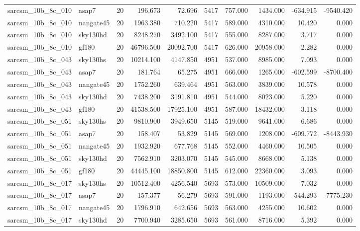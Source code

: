\begin{tabular}{llrrrrrrrr}
sarcsm\_10b\_8c\_010 & asap7 & 20 & 196.673 & 72.696 & 5417 & 757.000 & 1434.000 & -634.915 & -9540.420 \\
sarcsm\_10b\_8c\_010 & nangate45 & 20 & 1963.380 & 710.220 & 5417 & 589.000 & 4310.000 & 10.420 & 0.000 \\
sarcsm\_10b\_8c\_010 & sky130hd & 20 & 8248.270 & 3492.100 & 5417 & 555.000 & 8287.000 & 3.717 & 0.000 \\
sarcsm\_10b\_8c\_010 & gf180 & 20 & 46796.500 & 20092.700 & 5417 & 626.000 & 20958.000 & 2.282 & 0.000 \\
sarcsm\_10b\_8c\_043 & sky130hs & 20 & 10214.100 & 4147.850 & 4951 & 537.000 & 8985.000 & 7.093 & 0.000 \\
sarcsm\_10b\_8c\_043 & asap7 & 20 & 181.764 & 65.275 & 4951 & 666.000 & 1265.000 & -602.599 & -8700.400 \\
sarcsm\_10b\_8c\_043 & nangate45 & 20 & 1752.260 & 639.464 & 4951 & 563.000 & 3839.000 & 10.578 & 0.000 \\
sarcsm\_10b\_8c\_043 & sky130hd & 20 & 7438.200 & 3191.810 & 4951 & 544.000 & 8023.000 & 5.220 & 0.000 \\
sarcsm\_10b\_8c\_043 & gf180 & 20 & 41538.500 & 17925.100 & 4951 & 587.000 & 18432.000 & 3.118 & 0.000 \\
sarcsm\_10b\_8c\_051 & sky130hs & 20 & 9810.900 & 3949.650 & 5145 & 519.000 & 9641.000 & 6.686 & 0.000 \\
sarcsm\_10b\_8c\_051 & asap7 & 20 & 158.407 & 53.829 & 5145 & 569.000 & 1208.000 & -609.772 & -8443.930 \\
sarcsm\_10b\_8c\_051 & nangate45 & 20 & 1932.920 & 677.768 & 5145 & 552.000 & 4460.000 & 10.505 & 0.000 \\
sarcsm\_10b\_8c\_051 & sky130hd & 20 & 7562.910 & 3203.070 & 5145 & 545.000 & 8668.000 & 5.138 & 0.000 \\
sarcsm\_10b\_8c\_051 & gf180 & 20 & 44445.100 & 18850.800 & 5145 & 612.000 & 22360.000 & 3.093 & 0.000 \\
sarcsm\_10b\_8c\_017 & sky130hs & 20 & 10512.400 & 4256.540 & 5693 & 573.000 & 10509.000 & 7.032 & 0.000 \\
sarcsm\_10b\_8c\_017 & asap7 & 20 & 157.377 & 56.279 & 5693 & 591.000 & 1193.000 & -544.293 & -7775.230 \\
sarcsm\_10b\_8c\_017 & nangate45 & 20 & 1796.910 & 642.656 & 5693 & 563.000 & 4255.000 & 10.602 & 0.000 \\
sarcsm\_10b\_8c\_017 & sky130hd & 20 & 7700.940 & 3285.650 & 5693 & 561.000 & 8716.000 & 5.392 & 0.000 \\

\end{tabular}
